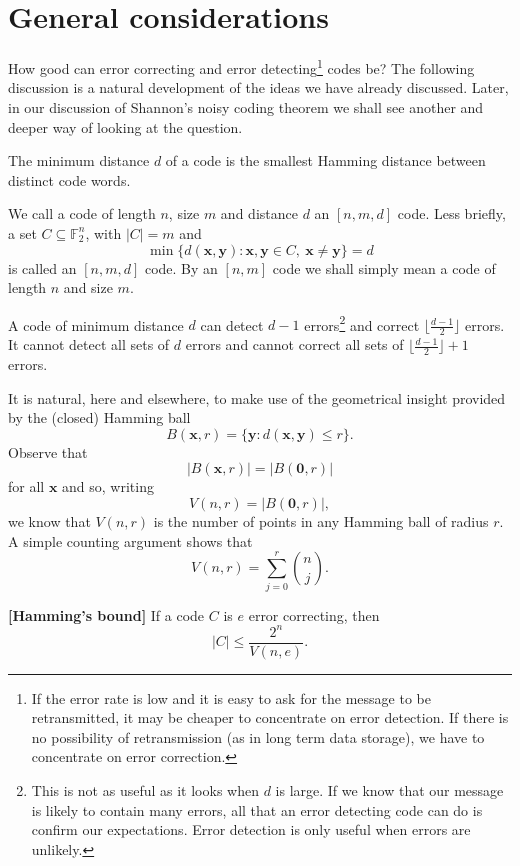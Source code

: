 \section{General considerations} How good
can error correcting and error 
detecting\footnote{If the error rate is low and it is easy
to ask for the message to be retransmitted, it may be
cheaper to concentrate on error detection. If there is
no possibility of retransmission (as in long term data storage),
we have to concentrate on error correction.}
codes be? The following discussion is a natural
development of the ideas we have already
discussed. Later, in our discussion of Shannon's noisy coding
theorem we shall see another
and deeper way
of looking at the question. 
\begin{definition} The minimum distance $d$
of a code is the smallest Hamming distance
between distinct code words.
\end{definition}
We call a code of length $n$,  size $m$ and
distance $d$ an $[n,m,d]$ code. Less briefly,
a set $C\subseteq{\mathbb F}_{2}^{n}$,
with $|C|=m$ and
\[\min\{d({\mathbf x},{\mathbf y}):
{\mathbf x},{\mathbf y}\in C,\ {\mathbf x}\neq{\mathbf y}\}
=d\]
is called an $[n,m,d]$ code. By an $[n,m]$ code
we shall simply mean a code of length $n$
and size $m$.

\begin{lemma}\label{minimum distance}
A code of minimum distance
$d$ can detect $d-1$ errors\footnote{This is not
as useful as it looks when $d$ is large. If we know
that our message is likely to contain many
errors, all that an error detecting code
can do is confirm our expectations.
Error detection is only useful when errors are
unlikely.} and correct
$\lfloor\frac{d-1}{2}\rfloor$ errors.
It cannot detect all sets of $d$ errors
and cannot correct all sets of
$\lfloor\frac{d-1}{2}\rfloor+1$ errors.
\end{lemma}
It is natural, here and elsewhere, to make use
of the geometrical insight provided by the
(closed) Hamming ball
\[B({\mathbf x},r)=\{{\mathbf y}:
d({\mathbf x},{\mathbf y})\leq r\}.\]
Observe that
\[|B({\mathbf x},r)|=|B({\boldsymbol 0},r)|\]
for all ${\mathbf x}$ and so, writing
\[V(n,r)=|B({\boldsymbol 0},r)|,\]
we know that $V(n,r)$ is the number of points in any
Hamming ball of radius $r$. A simple counting
argument shows that
\[V(n,r)=\sum_{j=0}^{r}\binom{n}{j}.\]
\begin{theorem}{\bf [Hamming's bound]}\label{Hamming's bound} If a
code $C$ is $e$ error correcting, then
\[|C|\leq \frac{2^{n}}{V(n,e)}.\]
\end{theorem}

